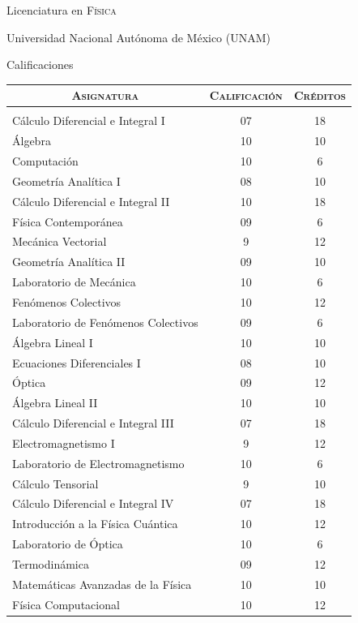 \documentclass[a4paper,10pt]{article} %
\begin{document}
\newpage
\par{\centering\LARGE \hypertarget{grdsbach}{Licenciatura en \textsc{Física}}\par}\par{\centering\Large Universidad Nacional Autónoma de México (UNAM)\par}\large{\centering Calificaciones\par}\small
\bigskip
\bigskip
\bigskip
\begin{center}
\begin{tabular}{lcc}
\multicolumn{1}{c}{\textsc{Asignatura}} & \textsc{Calificación}&\textsc{Créditos}\\ \hline \\
Cálculo Diferencial e Integral I & 07 & 18\\
Álgebra & 10 & 10\\
Computación & 10 & 6\\
Geometría Analítica I & 08 & 10\\
Cálculo Diferencial e Integral II & 10 & 18\\ 
Física Contemporánea & 09 & 6\\
Mecánica Vectorial & 9 & 12\\ 
Geometría Analítica II & 09 & 10\\
Laboratorio de Mecánica & 10 & 6\\
Fenómenos Colectivos & 10 & 12\\
Laboratorio de Fenómenos Colectivos & 09 & 6\\
Álgebra Lineal I & 10 & 10\\ 
Ecuaciones Diferenciales I & 08 & 10\\
Óptica & 09 & 12\\
Álgebra Lineal II & 10 & 10\\
Cálculo Diferencial e Integral III & 07 & 18\\
Electromagnetismo I & 9 & 12\\
Laboratorio de Electromagnetismo & 10 & 6\\
Cálculo Tensorial & 9 & 10\\
Cálculo Diferencial e Integral IV & 07 & 18\\
Introducción a la Física Cuántica & 10 & 12\\
Laboratorio de Óptica & 10 & 6\\
Termodinámica & 09 & 12\\
Matemáticas Avanzadas de la Física & 10 & 10\\
Física Computacional & 10 & 12\\

\end{tabular}
\end{center}
\end{document}
